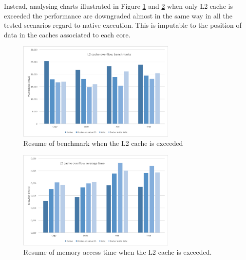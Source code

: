 Instead, analysing charts illustrated in Figure \ref{img:measurements-storage-results-l2Capacity}
and \ref{img:measurements-storage-results-l2Time} when only L2 cache is exceeded the performance are
downgraded almost in the same way in all the tested scenarios regard to native execution. This is
imputable to the position of data in the caches associated to each core.

\begin{figure}
	\centering{}
	\includegraphics[width=0.7\textwidth]{chapters/measurements/images/storage-l2-capacity.png}
	\caption[Storage - overflow L2 cache]{Resume of benchmark when the L2 cache is exceeded}
	\label{img:measurements-storage-results-l2Capacity}
\end{figure}

\begin{figure}
	\centering{}
	\includegraphics[width=0.7\textwidth]{chapters/measurements/images/storage-l2-time.png}
	\caption[Storage - access time L2 cache exceeded]{Resume of memory access time when the L2
		cache is exceeded.}
	\label{img:measurements-storage-results-l2Time}
\end{figure}